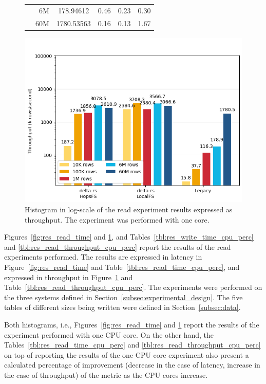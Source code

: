 \begin{figure}
\begin{minipage}[b]{\textwidth}
\begin{tabular}{c r S[table-format=4.5] S[table-format=2.2] S[table-format=2.2] S[table-format=2.2]}
            & 6M &   178.94612 & 0.46 & 0.23 & 0.30\\
            & 60M &  1780.53563 & 0.16 & 0.13 & 1.67\\
            \bottomrule
        \end{tabular}
    \end{minipage}
    \begin{minipage}[b]{\textwidth}
        \includegraphics[width=\textwidth]{figures/5-results/read/read_throughput_1_core.png}
        \caption[Histogram of the read experiment - Throughput - 1 CPU core]{Histogram in log-scale of the read experiment results expressed as throughput. The experiment was performed with one  core.}
        \label{fig:res_read_throughput}
    \end{minipage}
\end{figure}

Figures~\ref{fig:res_read_time} and \ref{fig:res_read_throughput}, and Tables~\ref{tbl:res_write_time_cpu_perc} and \ref{tbl:res_read_throughput_cpu_perc} report the results of the read experiments performed. The results are expressed in latency in Figure~\ref{fig:res_read_time} and Table~\ref{tbl:res_read_time_cpu_perc}, and expressed in throughput in Figure~\ref{fig:res_read_throughput} and Table~\ref{tbl:res_read_throughput_cpu_perc}. The experiments were performed on the three systems defined in Section~\ref{subsec:experimental_design}. The five tables of different sizes being written were defined in Section~\ref{subsec:data}.

Both histograms, i.e., Figures~\ref{fig:res_read_time} and \ref{fig:res_read_throughput} report the results of the experiment performed with one \gls{CPU} core. On the other hand, the Tables~\ref{tbl:res_read_time_cpu_perc} and \ref{tbl:res_read_throughput_cpu_perc} on top of reporting the results of the one \gls{CPU} core experiment also present a calculated percentage of improvement (decrease in the case of latency, increase in the case of throughput) of the metric as the \gls{CPU} cores increase.

